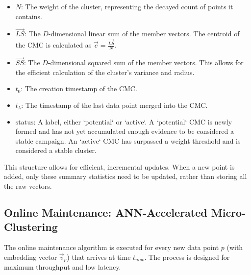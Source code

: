 \documentclass[journal,article,submit,pdftex,moreauthors]{Definitions/mdpi}
\begin{document}
\begin{itemize}
    \item $N$: The weight of the cluster, representing the decayed count of points it contains.
    \item $\vec{LS}$: The $D$-dimensional linear sum of the member vectors. The centroid of the CMC is calculated as $\vec{c} = \frac{\vec{LS}}{N}$.
    \item $\vec{SS}$: The $D$-dimensional squared sum of the member vectors. This allows for the efficient calculation of the cluster's variance and radius.
    \item $t_0$: The creation timestamp of the CMC.
    \item $t_\lambda$: The timestamp of the last data point merged into the CMC.
    \item $\text{status}$: A label, either `potential` or `active`. A `potential` CMC is newly formed and has not yet accumulated enough evidence to be considered a stable campaign. An `active` CMC has surpassed a weight threshold and is considered a stable cluster.
\end{itemize}

This structure allows for efficient, incremental updates. When a new point is added, only these summary statistics need to be updated, rather than storing all the raw vectors.

\subsection{Online Maintenance: ANN-Accelerated Micro-Clustering}

The online maintenance algorithm is executed for every new data point $p$ (with embedding vector $\vec{v}_p$) that arrives at time $t_{now}$. The process is designed for maximum throughput and low latency.
\end{document}
